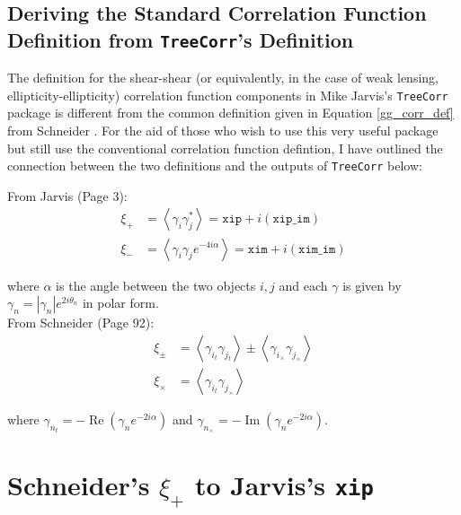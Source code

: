 \documentclass[%
 reprint,
 amsmath,amssymb,
 aps,nofootinbib
]{revtex4-1}
\begin{document}

\newpage

\subsection{Deriving the Standard Correlation Function Definition from \texttt{TreeCorr}'s Definition} \label{corr_defs}

The definition for the shear-shear (or equivalently, in the case of weak lensing, ellipticity-ellipticity) correlation function components in Mike Jarvis's \texttt{TreeCorr} package is different from the common definition given in Equation \eqref{gg_corr_def} from Schneider \cite{schneider}. For the aid of those who wish to use this very useful package but still use the conventional correlation function defintion, I have outlined the connection between the two definitions and the outputs of \texttt{TreeCorr} below:

\setlength\parindent{0pt}

\vspace{0.25 in}

From Jarvis \cite{jarvis} (Page 3):
\begin{align}
\xi_+&=\left<\gamma_i\gamma_j^*\right>=\texttt{xip}+i(\texttt{xip\_im})\label{s+}\\
\xi_-&=\left<\gamma_i\gamma_je^{-4i\alpha}\right>=\texttt{xim}+i(\texttt{xim\_im})\label{s-}
\end{align}

where $\alpha$ is the angle between the two objects $i,j$ and each $\gamma$ is given by $\gamma_n=|\gamma_n|e^{2i\theta_n}$ in polar form.\\

From Schneider \cite{schneider} (Page 92):
\begin{align}
\xi_\pm&=\left<\gamma_{i_t}\gamma_{j_t}\right>\pm\left<\gamma_{i_\times}\gamma_{j_\times}\right>\label{s+-}\\
\xi_\times&=\left<\gamma_{i_t}\gamma_{j_\times}\right>\label{sx}
\end{align}

where $\gamma_{n_t}=-\operatorname{Re}\left(\gamma_n e^{-2i\alpha}\right)$ and $\gamma_{n_\times}=-\operatorname{Im}\left(\gamma_n e^{-2i\alpha}\right)$.\\

\section*{Schneider's $\xi_+$ to Jarvis's \texttt{xip}}
\end{document}
